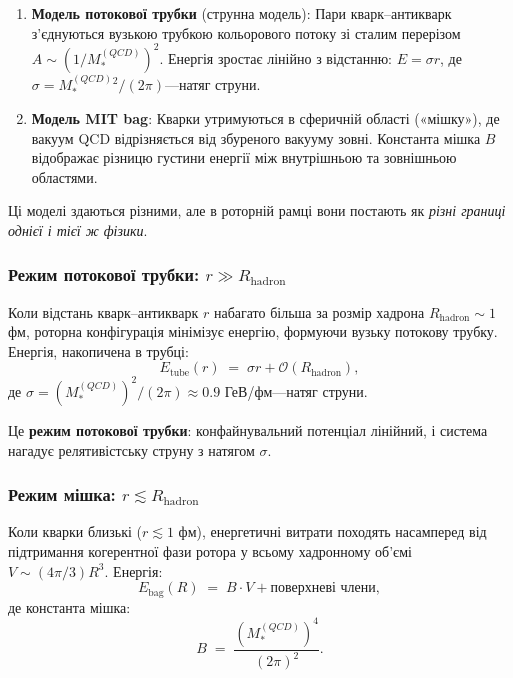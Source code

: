 \documentclass[11pt,a4paper]{article}
\theoremstyle{definition}
\theoremstyle{plain}
\theoremstyle{remark}
\begin{document}
\begin{enumerate}
  \item \textbf{Модель потокової трубки} (струнна модель): Пари кварк–антикварк з'єднуються вузькою трубкою кольорового потоку зі сталим перерізом $A \sim (1/M_*^{(QCD)})^2$. Енергія зростає лінійно з відстанню: $E = \sigma r$, де $\sigma = M_*^{(QCD)} {}^2 /(2\pi)$—натяг струни.

  \item \textbf{Модель MIT bag}: Кварки утримуються в сферичній області («мішку»), де вакуум QCD відрізняється від збуреного вакууму зовні. Константа мішка $B$ відображає різницю густини енергії між внутрішньою та зовнішньою областями.
\end{enumerate}

Ці моделі здаються різними, але в роторній рамці вони постають як \emph{різні границі однієї і тієї ж фізики}.

\subsubsection{Режим потокової трубки: $r \gg R_{\mathrm{hadron}}$}

Коли відстань кварк–антикварк $r$ набагато більша за розмір хадрона $R_{\mathrm{hadron}} \sim 1$ фм, роторна конфігурація мінімізує енергію, формуючи вузьку потокову трубку. Енергія, накопичена в трубці:
\begin{equation}
E_{\mathrm{tube}}(r) \;=\; \sigma r + \mathcal{O}(R_{\mathrm{hadron}}),
\end{equation}
де $\sigma = (M_*^{(QCD)})^2 / (2\pi) \approx 0{.}9$ ГеВ/фм—натяг струни.

Це \textbf{режим потокової трубки}: конфайнувальний потенціал лінійний, і система нагадує релятивістську струну з натягом $\sigma$.

\subsubsection{Режим мішка: $r \lesssim R_{\mathrm{hadron}}$}

Коли кварки близькі ($r \lesssim 1$ фм), енергетичні витрати походять насамперед від підтримання когерентної фази ротора у всьому хадронному об'ємі $V \sim (4\pi/3)R^3$. Енергія:
\begin{equation}
E_{\mathrm{bag}}(R) \;=\; B \cdot V + \text{поверхневі члени},
\end{equation}
де константа мішка:
\begin{equation}
B \;=\; \frac{(M_*^{(QCD)})^4}{(2\pi)^2}.
\end{equation}
\end{document}
